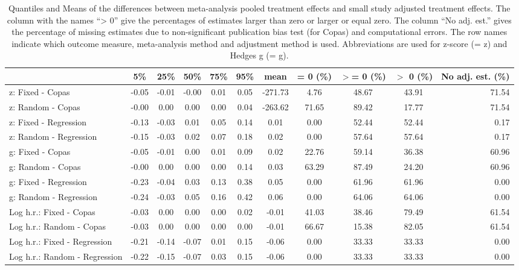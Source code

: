 \begin{table}[ht]
\centering
\begingroup\scriptsize
\begin{tabular}{lcccccccccr}
  \hline
 & 5\% & 25\% & 50\% & 75\% & 95\% & mean & = 0 (\%) & $>$= 0 (\%) & $>$ 0 (\%) & No adj. est. (\%) \\ 
  \hline
z: Fixed - Copas & -0.05 & -0.01 & -0.00 & 0.01 & 0.05 & -271.73 & 4.76 & 48.67 & 43.91 & 71.54 \\ 
  z: Random - Copas & -0.00 & 0.00 & 0.00 & 0.00 & 0.04 & -263.62 & 71.65 & 89.42 & 17.77 & 71.54 \\ 
  z: Fixed - Regression & -0.13 & -0.03 & 0.01 & 0.05 & 0.14 & 0.01 & 0.00 & 52.44 & 52.44 & 0.17 \\ 
  z: Random - Regression & -0.15 & -0.03 & 0.02 & 0.07 & 0.18 & 0.02 & 0.00 & 57.64 & 57.64 & 0.17 \\ 
  g: Fixed - Copas & -0.05 & -0.01 & 0.00 & 0.01 & 0.09 & 0.02 & 22.76 & 59.14 & 36.38 & 60.96 \\ 
  g: Random - Copas & -0.00 & 0.00 & 0.00 & 0.00 & 0.14 & 0.03 & 63.29 & 87.49 & 24.20 & 60.96 \\ 
  g: Fixed - Regression & -0.23 & -0.04 & 0.03 & 0.13 & 0.38 & 0.05 & 0.00 & 61.96 & 61.96 & 0.00 \\ 
  g: Random - Regression & -0.24 & -0.03 & 0.05 & 0.16 & 0.42 & 0.06 & 0.00 & 64.06 & 64.06 & 0.00 \\ 
  Log h.r.: Fixed - Copas & -0.03 & 0.00 & 0.00 & 0.00 & 0.02 & -0.01 & 41.03 & 38.46 & 79.49 & 61.54 \\ 
  Log h.r.: Random - Copas & -0.03 & 0.00 & 0.00 & 0.00 & 0.00 & -0.01 & 66.67 & 15.38 & 82.05 & 61.54 \\ 
  Log h.r.: Fixed - Regression & -0.21 & -0.14 & -0.07 & 0.01 & 0.15 & -0.06 & 0.00 & 33.33 & 33.33 & 0.00 \\ 
  Log h.r.: Random - Regression & -0.22 & -0.15 & -0.07 & 0.03 & 0.15 & -0.06 & 0.00 & 33.33 & 33.33 & 0.00 \\ 
   \hline
\end{tabular}
\endgroup
\caption{Quantiles and Means of the differences between meta-analysis pooled treatment effects and small study adjusted treatment effects. The column with the names ``> 0'' give the percentages of estimates larger than zero or larger or equal zero. The column ``No adj. est.'' gives the percentage of missing estimates due to non-significant publication bias test (for Copas) and computational errors. The row names indicate which outcome measure, meta-analysis method and adjustment method is used. Abbreviations are used for z-score (= z) and Hedges g (= g).} 
\label{adjustment.difference}
\end{table}




